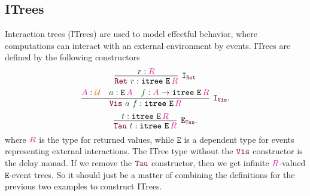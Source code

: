 \documentclass[twoside,11pt,openright]{report}
\theoremstyle{plain} %
\theoremstyle{definition}
\theoremstyle{remark}
\newcommand*{\term}[1]{\textcolor{green!30!black}{#1}} %
\newcommand*{\type}[1]{\textcolor{magenta!90!black}{#1}}
\newcommand*{\universe}[1]{\textcolor{orange!80!black}{#1}}
\newcommand*{\constructor}[1]{\textcolor{purple!60!black}{\ensuremath{\mathtt{#1}}}}
\newcommand*{\typeformer}[1]{\ensuremath{\mathtt{#1}}}
\begin{document}
\subsection{ITrees}
Interaction trees (ITrees) \cite{DBLP:itrees} are used to model effectful behavior, where computations can interact with an external environment by events. ITrees are defined by the following constructors
\begin{equation}
  \vcenter{\infer[\mathtt{I}_{\constructor{Ret}}]{\constructor{Ret}~\term{r} : \typeformer{itree}~\typeformer{E}\,\type{R}}{r : \type{R}}}
\end{equation}
\begin{equation}
  \vcenter{\infer[\mathtt{I}_{\constructor{Vis}}]{\constructor{Vis}~\term{a}~\term{f} : \typeformer{itree}~\typeformer{E}\,\type{R}}{\type{A} : \universe{\mathcal{U}} & \term{a} : \typeformer{E}\,\type{A} & \term{f} : \type{A} \rightarrow \typeformer{itree}~\typeformer{E}\,\type{R}}}.
\end{equation}
\begin{equation}
  \vcenter{\infer[\mathtt{E}_{\constructor{Tau}}]{\constructor{Tau}~\term{t} : \typeformer{itree}~\typeformer{E}\,\type{R}}{\term{t} : \typeformer{itree}~\typeformer{E}\,\type{R}}}.
\end{equation}
where \(\type{R}\) is the type for returned values, while \(\typeformer{E}\) is a dependent type for events representing external interactions. The ITree type without the \(\constructor{Vis}\) constructor is the delay monad. If we remove the \(\constructor{Tau}\) constructor, then we get infinite \(\type{R}\)-valued \(\typeformer{E}\)-event trees. So it should just be a matter of combining the definitions for the previous two examples to construct ITrees.
\end{document}
